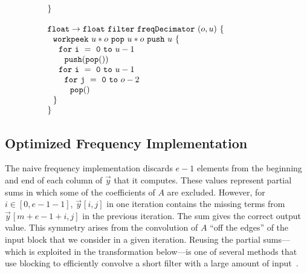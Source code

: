\begin{transformation}
\begin{equation}
\begin{array}{ll}
    {\tt \}} \\ ~ \\
    {\tt float \rightarrow float}~{\tt filter~freqDecimator~}(o, u){\tt ~\{} & \hspace{40pt}\\
    ~~{\tt work}{\tt peek}~u*o~{\tt pop}~u*o~{\tt push}~u~{\tt \{} \\
    ~~~~{\tt for~i~=~0~to~}u-1 \\
    ~~~~~~{\tt push(pop())} \\
    ~~~~{\tt for~i~=~0~to~}u-1 \\
    ~~~~~~{\tt for~j~=~0~to~}o-2 \\
    ~~~~~~~~{\tt pop()} \\
    ~~{\tt \}} \\
    {\tt \}}
  \end{array}
\end{equation}
\label{trans:freq1}
\end{transformation}

\subsection{Optimized Frequency Implementation}

The naive frequency implementation discards $e-1$ elements from the
beginning and end of each column of ${\vec y}$ that it computes.
These values represent partial sums in which some of the coefficients
of $A$ are excluded. However, for $i \in [0, e-1-1]$, ${\vec
y}\hspace{1pt}[i,j]$ in one iteration contains the missing terms from
${\vec y}\hspace{1pt}[m+e-1+i,j]$ in the previous iteration.  The sum
gives the correct output value.  This symmetry arises from the
convolution of $A$ ``off the edges'' of the input block that we
consider in a given iteration. Reusing the partial sums---which is
exploited in the transformation below---is one of several methods that
use blocking to efficiently convolve a short filter with a large
amount of input~\cite{oppenheim-discrete}.

